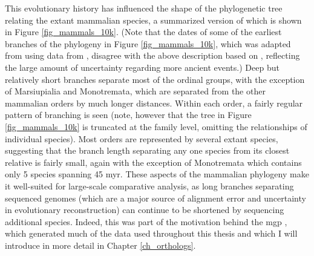 This evolutionary history has influenced the shape of the phylogenetic
tree relating the extant mammalian species, a summarized version of
which is shown in Figure \ref{fig_mammals_10k}. (Note that the dates
of some of the earliest branches of the phylogeny in Figure
\ref{fig_mammals_10k}, which was adapted from \citet{Haussler2009}
using data from \citet{Hedges2009}, disagree with the above
description based on \citet{BinindaEmonds2007}, reflecting the large
amount of uncertainty regarding more ancient events.) Deep but
relatively short branches separate most of the ordinal groups, with
the exception of Marsiupialia and Monotremata, which are separated
from the other mammalian orders by much longer distances. Within each
order, a fairly regular pattern of branching is seen (note, however
that the tree in Figure \ref{fig_mammals_10k} is truncated at the
family level, omitting the relationships of individual species). Most
orders are represented by several extant species, suggesting that the
branch length separating any one species from its closest relative is
fairly small, again with the exception of Monotremata which contains
only 5 species spanning 45 \ac{myr}. These aspects of the mammalian
phylogeny make it well-suited for large-scale comparative analysis, as
long branches separating sequenced genomes (which are a major source
of alignment error and uncertainty in evolutionary reconstruction) can
continue to be shortened by sequencing additional species. Indeed,
this was part of the motivation behind the \ac{mgp}
\citep{LindbladToh2011}, which generated much of the data used
throughout this thesis and which I will introduce in more detail in
Chapter \ref{ch_orthologs}.

